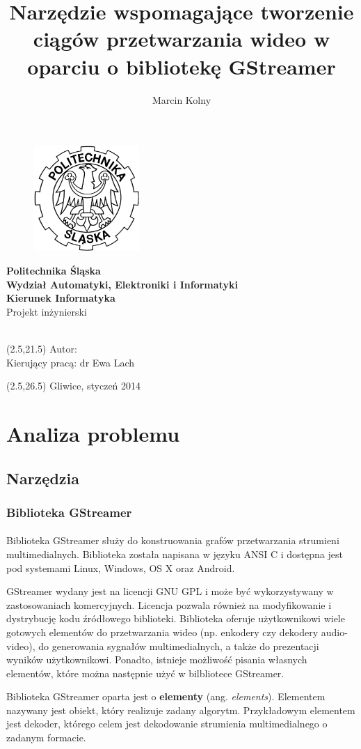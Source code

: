 \documentclass[12pt]{article}
\title{Narzędzie wspomagające tworzenie ciągów przetwarzania wideo w oparciu o bibliotekę GStreamer}
\author{Marcin Kolny}
\renewcommand{\maketitle}{
  \begin{titlepage}
    \begin{figure}  
      \includegraphics[width=40mm]{img/polsl-logo.png}
    \end{figure}
    \begin{center}
      \begingroup
      \fontsize{18pt}{21pt}\selectfont
      \textbf{Politechnika Śląska\\
        Wydział Automatyki, Elektroniki i Informatyki\\
        Kierunek Informatyka}\\
      \vspace{22mm}
      Projekt inżynierski\\
      \vspace{22mm}
      \endgroup
      \begingroup
      \fontsize{14pt}{17pt}\selectfont
      \thetitle \\
      \endgroup
      \vspace{30mm}
    \end{center}
    \begin{textblock}{14}(2.5,21.5)
      \fontsize{14pt}{17pt}\selectfont
      Autor: \theauthor \\
      Kierujący pracą: dr Ewa Lach\\
    \end{textblock}
    \begin{textblock}{20}(2.5,26.5)
      \fontsize{14pt}{17pt}\selectfont
      Gliwice, styczeń 2014\\
    \end{textblock}

  \end{titlepage}
}
\begin{document}
\maketitle
\tableofcontents
\cleardoublepage
\section{Analiza problemu}
\subsection{Narzędzia}
\subsubsection{Biblioteka GStreamer}
\paragraph{}
Biblioteka GStreamer służy do konstruowania grafów przetwarzania strumieni multimedialnych. Biblioteka została napisana w języku ANSI C i dostępna jest pod systemami Linux, Windows, OS X oraz Android.

GStreamer wydany jest na licencji GNU GPL i może być wykorzystywany w zastosowaniach komercyjnych. Licencja pozwala również na modyfikowanie i dystrybucję kodu źródłowego biblioteki.
Biblioteka oferuje użytkownikowi wiele gotowych elementów do przetwarzania wideo (np. enkodery czy dekodery audio-video), do generowania sygnałów multimedialnych, a także do prezentacji wyników użytkownikowi. Ponadto, istnieje możliwość pisania własnych elementów, które można następnie użyć w bilbliotece GStreamer.

Biblioteka GStreamer oparta jest o \textbf{elementy} (ang. \textit{elements}). Elementem nazywany jest obiekt, który realizuje zadany algorytm. Przykładowym elementem jest dekoder, którego celem jest dekodowanie strumienia multimedialnego o zadanym formacie.
\end{document}
